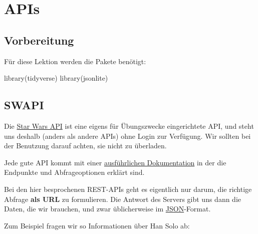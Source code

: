 \documentclass[
  ngerman,
]{article}
\newenvironment{Shaded}{\begin{snugshade}}{\end{snugshade}}
\newcommand{\FunctionTok}[1]{\textcolor[rgb]{0.00,0.00,0.00}{#1}}
\newcommand{\NormalTok}[1]{#1}
\newcommand{\OtherTok}[1]{\textcolor[rgb]{0.56,0.35,0.01}{#1}}
\newcommand{\SpecialCharTok}[1]{\textcolor[rgb]{0.00,0.00,0.00}{#1}}
\newcommand{\StringTok}[1]{\textcolor[rgb]{0.31,0.60,0.02}{#1}}
\begin{document}
\hypertarget{apis}{%
\section{APIs}\label{apis}}

\hypertarget{vorbereitung-4}{%
\subsection{Vorbereitung}\label{vorbereitung-4}}

Für diese Lektion werden die Pakete benötigt:

\begin{Shaded}
\begin{Highlighting}[]
\FunctionTok{library}\NormalTok{(tidyverse)}
\FunctionTok{library}\NormalTok{(jsonlite)}
\end{Highlighting}
\end{Shaded}

\hypertarget{swapi}{%
\subsection{SWAPI}\label{swapi}}

Die \href{https://www.swapi.tech/}{Star Wars API} ist eine eigens für Übungszwecke eingerichtete API, und steht uns deshalb (anders als andere APIs) ohne Login zur Verfügung. Wir sollten bei der Benutzung darauf achten, sie nicht zu überladen.

Jede gute API kommt mit einer \href{https://www.swapi.tech/documentation}{ausführlichen Dokumentation} in der die Endpunkte und Abfrageoptionen erklärt sind.

Bei den hier besprochenen REST-APIs geht es eigentlich nur darum, die richtige Abfrage \textbf{als URL} zu formulieren. Die Antwort des Servers gibt uns dann die Daten, die wir brauchen, und zwar üblicherweise im \href{https://de.wikipedia.org/wiki/JavaScript_Object_Notation}{JSON}-Format.

Zum Beispiel fragen wir so Informationen über Han Solo ab:

\begin{Shaded}
\end{Shaded}
\end{document}
